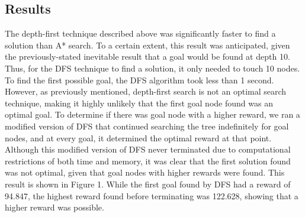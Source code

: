 \documentclass[11pt,journal]{IEEEtran}
\begin{document}
\subsection{Results}
The depth-first technique described above was significantly faster to find a solution than A* search. To a certain extent, this result was anticipated, given the previously-stated inevitable result that a goal would be found at depth 10. Thus, for the DFS technique to find a solution, it only needed to touch 10 nodes. To find the first possible goal, the DFS algorithm took less than 1 second. However, as previously mentioned, depth-first search is not an optimal search technique, making it highly unlikely that the first goal node found was an optimal goal. To determine if there was goal node with a higher reward, we ran a modified version of DFS that continued searching the tree indefinitely for goal nodes, and at every goal, it determined the optimal reward at that point. Although this modified version of DFS never terminated due to computational restrictions of both time and memory, it was clear that the first solution found was not optimal, given that goal nodes with higher rewards were found. This result is shown in Figure 1. While the first goal found by DFS had a reward of 94.847, the highest reward found before terminating was 122.628, showing that a higher reward was possible. 
\end{document}
